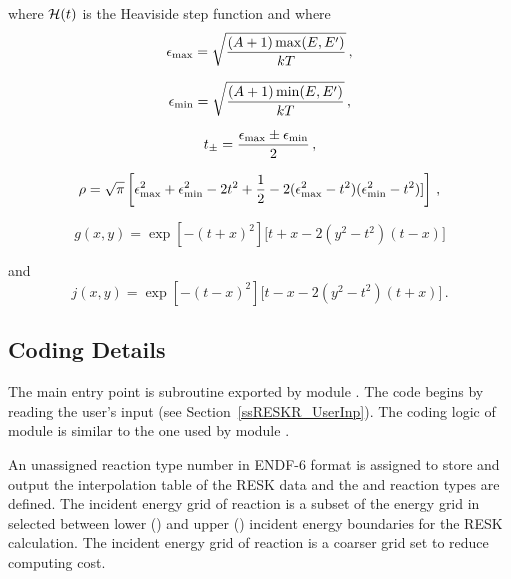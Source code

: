 \noindent where ${\cal H}(t)$ is the Heaviside step function and where
\begin{equation}
\epsilon_{\rm max}=\sqrt{(A+1)\max(E,E')\over kT}\, ,
\label{resk9}
\end{equation}

\begin{equation}
\epsilon_{\rm min}=\sqrt{(A+1)\min(E,E')\over kT}\, ,
\label{resk10}
\end{equation}

\begin{equation}
t_\pm={\epsilon_{\rm max}\pm \epsilon_{\rm min}\over 2}\, ,
\label{resk11}
\end{equation}

\begin{equation}
\rho=\sqrt{\pi} \left[\epsilon_{\rm max}^2 +\epsilon_{\rm min}^2 -2t^2
+{1\over 2} -2(\epsilon_{\rm max}^2 -t^2)(\epsilon_{\rm min}^2-t^2)]\right]\, ,
\label{resk12}
\end{equation}

\begin{equation}
g(x,y)=\exp\left[-(t+x)^2\right] \big[ t + x - 2(y^2 - t^2)(t-x)\big]
\label{resk13}
\end{equation}

\noindent and
\begin{equation}
j(x,y) = \exp\left[-(t-x)^2\right] \big[t - x - 2(y^2 - t^2)(t+x)\big] \, .
\label{resk14}
\end{equation}

\subsection{Coding Details}
\label{ssRESKR_details}

The main entry point is subroutine  exported by module
. The code begins by
reading the user's input (see Section~\ref{ssRESKR_UserInp}). The coding
logic of module  is similar to the one used by module
.

An unassigned reaction type number  in ENDF-6 format is assigned
to store and output the interpolation table of the RESK data and the
 and  reaction types are defined. The
incident energy grid of reaction  is a subset of the energy grid
in  selected between lower () and upper ()
incident energy boundaries for the RESK calculation. The incident energy grid
of reaction  is a coarser grid set to reduce computing cost.

